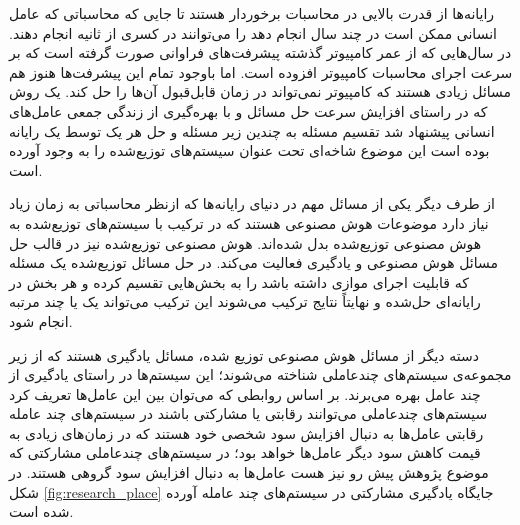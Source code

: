 رایانه‌ها از قدرت بالایی در محاسبات برخوردار هستند تا جایی که محاسباتی که عامل انسانی ممکن است در چند سال انجام دهد را می‌توانند در کسری از ثانیه انجام دهند. در سال‌هایی که از عمر کامپیوتر گذشته پیشرفت‌های فراوانی صورت گرفته است که بر سرعت اجرای محاسبات کامپیوتر افزوده است. اما باوجود تمام این پیشرفت‌ها هنوز هم مسائل زیادی هستند که کامپیوتر نمی‌تواند در زمان قابل‌قبول آن‌ها را حل کند. یک روش که در راستای افزایش سرعت حل مسائل و با بهره‌گیری از زندگی جمعی عامل‌های انسانی پیشنهاد شد تقسیم مسئله به چندین زیر مسئله و حل هر یک توسط یک رایانه بوده است این موضوع شاخه‌ای تحت عنوان سیستم‌های توزیع‌شده را به وجود آورده است.

از طرف دیگر یکی از مسائل مهم در دنیای رایانه‌ها که ازنظر محاسباتی به زمان زیاد نیاز دارد موضوعات هوش مصنوعی هستند که در ترکیب با سیستم‌های توزیع‌شده به هوش مصنوعی توزیع‌شده بدل شده‌اند. هوش مصنوعی توزیع‌شده نیز در قالب حل مسائل هوش مصنوعی و یادگیری فعالیت می‌کند. در حل مسائل توزیع‌شده یک مسئله که قابلیت اجرای موازی داشته باشد را به بخش‌هایی تقسیم کرده و هر بخش در رایانه‌ای حل‌شده و نهایتاً نتایج ترکیب می‌شوند این ترکیب می‌تواند یک یا چند مرتبه انجام شود.

دسته دیگر از مسائل هوش مصنوعی توزیع شده، مسائل یادگیری هستند که از زیر مجموعه‌ی سیستم‌های چندعاملی شناخته می‌شوند؛ این سیستم‌ها در راستای یادگیری از چند عامل بهره می‌برند. بر اساس روابطی که می‌توان بین این عامل‌ها تعریف کرد سیستم‌های چندعاملی می‌توانند رقابتی یا مشارکتی باشند در سیستم‌های چند عامله رقابتی عامل‌ها به دنبال افزایش سود شخصی خود هستند که در زمان‌های زیادی به قیمت کاهش سود دیگر عامل‌ها خواهد بود؛ در سیستم‌های چندعاملی مشارکتی که موضوع پژوهش پیش رو نیز هست عامل‌ها به دنبال افزایش سود گروهی هستند. در شکل
\ref{fig:research_place}
جایگاه یادگیری مشارکتی در سیستم‌های چند عامله آورده شده است.

